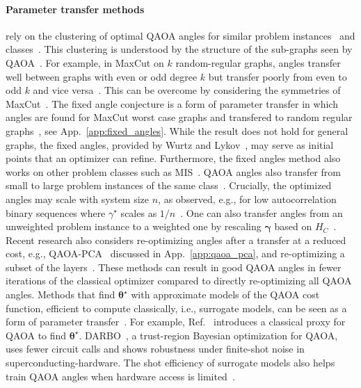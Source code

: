 \documentclass[twocolumn,
english,
aps,
pra,
10pt,
longbibliography,
superscriptaddress,
amsmath,
amssymb,
floatfix
]{revtex4-2}
\begin{document}
\paragraph{Parameter transfer methods} rely on the clustering of optimal QAOA angles for similar problem instances~\cite{Akshay2021, brandao2018, Shaydulin2019, Galda2021, Montanezbarrera2024Transfer, pelofske2026evaluatinglimitsqaoaparameter, Pelofske_2024_QAOA_scaling, Barron2024, Kotil_2025} and classes~\cite{Montanezbarrera2024Transfer}.
This clustering is understood by the structure of the sub-graphs seen by QAOA~\cite{Akshay2021, brandao2018, Shaydulin2019, Galda2021}.
For example, in MaxCut on $k$ random-regular graphs, angles transfer well between graphs with even or odd degree $k$ but transfer poorly from even to odd $k$ and vice versa~\cite{Galda2021}.
This can be overcome by considering the symmetries of MaxCut~\cite{Lyngfelt2025}.
The fixed angle conjecture is a form of parameter transfer in which angles are found for MaxCut worst case graphs and transfered to random regular graphs~\cite{Wurtz2021a, Wurtz2021}, see App.~\ref{app:fixed_angles}.
While the result does not hold for general graphs, the fixed angles, provided by Wurtz and Lykov~\cite{WurtzGithub}, may serve as initial points that an optimizer can refine.
Furthermore, the fixed angles method also works on other problem classes such as MIS~\cite{Wybo2025}.
QAOA angles also transfer from small to large problem instances of the same class~\cite{pelofske2026evaluatinglimitsqaoaparameter}.
Crucially, the optimized angles may scale with system size $n$, as observed, e.g., for low autocorrelation binary sequences where $\gamma^\star$ scales as $1/n$~\cite{Shaydulin2024}.
One can also transfer angles from an unweighted problem instance to a weighted one by rescaling $\boldsymbol{\gamma}$ based on $H_C$~\cite{Shaydulin2023, Sureshbabu2024, cepaite2025quantum}.
Recent research also considers re-optimizing angles after a transfer at a reduced cost, e.g., QAOA-PCA~\cite{Parry2025} discussed in App.~\ref{app:qaoa_pca}, and re-optimizing a subset of the layers~\cite{venturelli2024transfer}. 
These methods can result in good QAOA angles in fewer iterations of the classical optimizer compared to directly re-optimizing all QAOA angles.
Methods that find $\boldsymbol{\theta}^\star$ with approximate models of the QAOA cost function, efficient to compute classically, i.e., surrogate models, can be seen as a form of parameter transfer~\cite{Sud2024, Cheng2024, Oleary2025}.
For example, Ref.~\cite{Sud2024} introduces a classical proxy for QAOA to find $\boldsymbol{\theta}^\star$.
DARBO~\cite{Cheng2024}, a trust-region Bayesian optimization for QAOA, uses fewer circuit calls and shows robustness under finite-shot noise in superconducting-hardware.
The shot efficiency of surrogate models also helps train QAOA angles when hardware access is limited~\cite{Oleary2025}.
\end{document}
